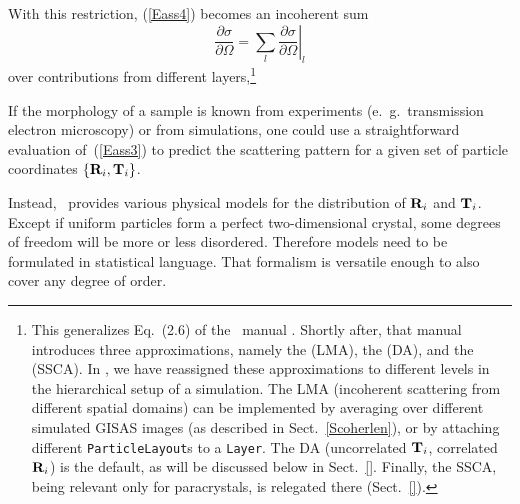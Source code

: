 With this restriction, (\ref{Eass4}) becomes an incoherent sum
\begin{equation}
  \frac{\partial\sigma}{\partial\Omega}
  = \sum_{l} \left.\frac{\partial\sigma}{\partial\Omega}\right|_l
\end{equation}
over contributions from different layers,\footnote
{This generalizes Eq.~(2.6) of the \IsGISAXS\ manual \cite{Laz08}.
Shortly after, that manual introduces three approximations,
namely
the  (LMA),
the  (DA),
%
%
and the  (SSCA).
%
%
In \BornAgain, we have reassigned these approximations
to different levels in the hierarchical setup of a simulation.
The LMA (incoherent scattering from different spatial domains)
can be implemented by averaging over different simulated GISAS images
(as described in Sect.~\ref{Scoherlen}),
or by attaching different \texttt{ParticleLayout}s to a \texttt{Layer}.
The DA (uncorrelated $\mathbf{T}_i$, correlated $\mathbf{R}_i$) is the default,
as will be discussed below in Sect.~\ref{}.
Finally, the SSCA, being relevant only for paracrystals,
is relegated there (Sect.~\ref{}).}

If the morphology of a sample is known from experiments
(e.~g.\ transmission electron microscopy) or from simulations,
one could use a straightforward evaluation of~(\ref{Eass3})
to predict the scattering pattern
for a given set of particle coordinates $\{\mathbf{R}_i,\mathbf{T}_i\}$.


Instead, \BornAgain\ provides various physical models 
for the distribution of $\mathbf{R}_i$ and $\mathbf{T}_i$.
Except if uniform particles form a perfect two-dimensional crystal,
some degrees of freedom will be more or less disordered.
Therefore models need to be formulated in statistical language.
That formalism is versatile enough to also cover any degree of order.

